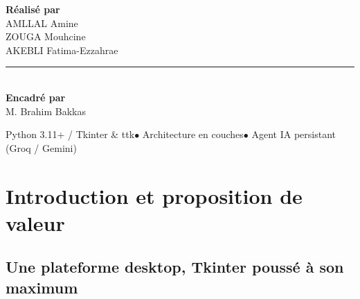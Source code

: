 \documentclass[11pt,a4paper]{report}
\begin{document}
\begin{titlepage}
\begin{center}
\begin{tcolorbox}[
    colback=light, colframe=rule, boxrule=0.6pt,
    width=0.80\linewidth, arc=4pt,
    left=20pt, right=20pt, top=14pt, bottom=14pt
]
\centering
{\sffamily\large\color{accent}\textbf{R\'ealis\'e par}}\\[8pt]
{\sffamily\large\color{primary}
AMLLAL Amine \\
ZOUGA Mouhcine \\
AKEBLI Fatima-Ezzahrae
}\\[14pt]
{\color{rule}\rule{0.4\linewidth}{0.4pt}}\\[10pt]
{\sffamily\large\color{accent}\textbf{Encadr\'e par}}\\[6pt]
{\sffamily\large\color{primary} M. Brahim Bakkas}
\end{tcolorbox}
\end{center}

\vfill

\begin{center}
{\sffamily\color{muted}\small
Python 3.11+ / Tkinter \& ttk\quad$\bullet$\quad
Architecture en couches\quad$\bullet$\quad
Agent IA persistant (Groq / Gemini)}
\end{center}

\end{titlepage}

\renewcommand{\contentsname}{\sffamily\color{primary}Table des mati\`eres}
\setcounter{tocdepth}{1}
\begingroup
\setlength{\parskip}{0pt}
\thispagestyle{plain}
\tableofcontents
\endgroup
\clearpage

\chapter{Introduction et proposition de valeur}

\section{Une plateforme desktop, Tkinter pouss\'e \`a son maximum}
\end{document}

